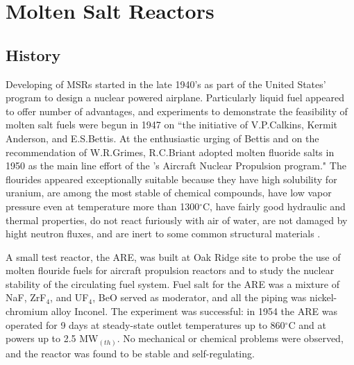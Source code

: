 \chapter[Molten Salt Reactors]{Molten Salt Reactors}


\section{History}
Developing of \glspl{MSR} started in the late 1940's as part of the United States' program to design a nuclear powered airplane. Particularly  liquid fuel appeared to offer number of advantages, and experiments to demonstrate the feasibility of molten salt fuels were begun in 1947 on ``the initiative of V.P.Calkins, Kermit Anderson, and E.S.Bettis. At the enthusiastic urging of Bettis and on the recommendation of W.R.Grimes, R.C.Briant adopted molten fluoride salts in 1950 as the main line effort of the 's Aircraft Nuclear Propulsion program." The flourides appeared exceptionally suitable because they have high solubility for uranium, are among the most stable of chemical compounds, have low vapor pressure even at temperature more than 1300$^{\circ}$C, have fairly good hydraulic and thermal properties, do not react furiously with air of water, are not damaged by hight neutron fluxes, and are inert to some common structural materials \cite{rosenthal_molten-salt_1970}.

A small test reactor, the \gls{ARE}, was built at Oak Ridge site to probe the use of molten flouride fuels for aircraft propulsion reactors and to study the nuclear stability of the circulating fuel system. Fuel salt for the \gls{ARE} was a mixture of NaF, ZrF$_4$, and UF$_4$, BeO served as moderator, and all the piping was nickel-chromium alloy Inconel. The experiment was successful: in 1954 the \gls{ARE} was operated for 9 days at steady-state outlet temperatures up to 860$^{\circ}$C and at powers up to 2.5 MW$_{(th)}$. No mechanical or chemical problems were observed, and the reactor was found to be stable and self-regulating.

